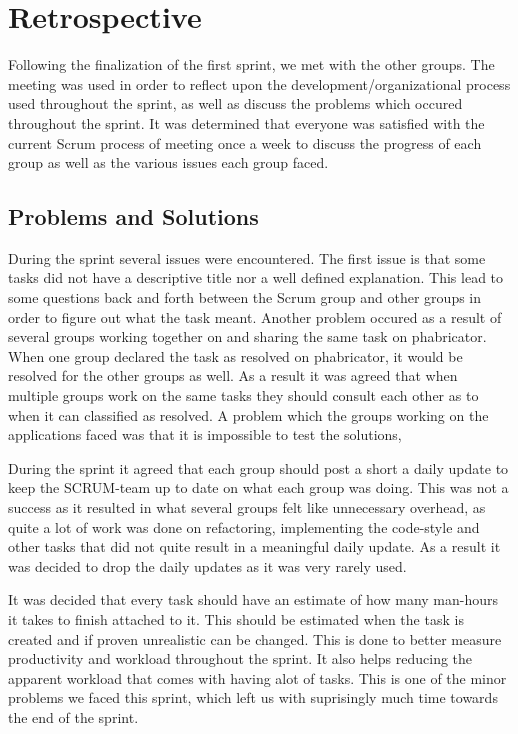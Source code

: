 \section{Retrospective}
Following the finalization of the first sprint, we met with the other
groups. The meeting was used in order to reflect upon the
development/organizational process used throughout the sprint, as well as
discuss the problems which occured throughout the sprint. It was determined
that everyone was satisfied with the current Scrum process of meeting once a
week to discuss the progress of each group as well as the various issues each
group faced.\nl

\subsection{Problems and Solutions}
During the sprint several issues were encountered. The first issue is that some
tasks did not have a descriptive title nor a well defined explanation. This lead
to some questions back and forth between the Scrum group and other groups in
order to figure out what the task meant. Another problem occured as a result of
several groups working together on and sharing the same task on phabricator.
When one group declared the task as resolved on phabricator, it would be
resolved for the other groups as well. As a result it was agreed that when
multiple groups work on the same tasks they should consult each other as to
when it can classified as resolved. A problem which the groups
working on the applications faced was that it is impossible to test the
solutions, \nl

During the sprint it agreed that each group should post a short a daily update
to keep the SCRUM-team up to date on what each group was doing. This was not a
success as it resulted in what several groups felt like unnecessary overhead, as
quite a lot of work was done on refactoring, implementing the code-style and
other tasks that did not quite result in a meaningful daily update. As
a result it was decided to drop the daily updates as it was very rarely used.\nl

It was decided that every task should have an estimate of how many man-hours it
takes to finish attached to it. This should be estimated when the task is
created and if proven unrealistic can be changed. This is done to better measure
productivity and workload throughout the sprint. It also helps reducing the
apparent workload that comes with having alot of tasks. This is one of the minor
problems we faced this sprint, which left us with suprisingly much time towards
the end of the sprint.

